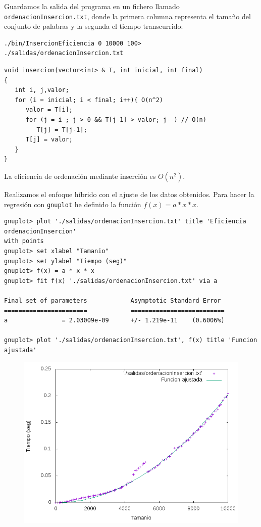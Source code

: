 \documentclass[11pt]{article}
\begin{document}
Guardamos la salida del programa en un fichero llamado \texttt{ordenacionInsercion.txt}, donde la primera columna representa el tamaño del conjunto de palabras y la segunda el tiempo transcurrido:
\begin{verbatim}
./bin/InsercionEficiencia 0 10000 100> ./salidas/ordenacionInsercion.txt
\end{verbatim}

\begin{verbatim}
void insercion(vector<int> & T, int inicial, int final)
{
   int i, j,valor;
   for (i = inicial; i < final; i++){ O(n^2)
      valor = T[i];
      for (j = i ; j > 0 && T[j-1] > valor; j--) // O(n)
         T[j] = T[j-1];
      T[j] = valor;
   }
}
\end{verbatim}

La eficiencia de ordenación mediante inserción es $O(n^2)$.

Realizamos el enfoque híbrido con el ajuste de los datos obtenidos. Para hacer la regresión con \texttt{gnuplot} he definido la función $f(x) = a * x * x$.

\begin{verbatim}
gnuplot> plot './salidas/ordenacionInsercion.txt' title 'Eficiencia ordenacionInsercion' 
with points
gnuplot> set xlabel "Tamanio"
gnuplot> set ylabel "Tiempo (seg)"
gnuplot> f(x) = a * x * x
gnuplot> fit f(x) './salidas/ordenacionInsercion.txt' via a

Final set of parameters            Asymptotic Standard Error
=======================            ==========================
a               = 2.03009e-09      +/- 1.219e-11    (0.6006%)

gnuplot> plot './salidas/ordenacionInsercion.txt', f(x) title 'Funcion ajustada'
\end{verbatim}

\begin{figure}[H]
\begin{center}
\includegraphics[width=12cm]{../salidas/ordenacionInsercion.png}
\end{center}
\end{figure}
\end{document}
